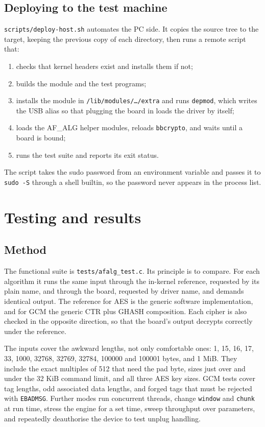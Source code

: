 \documentclass[11pt,a4paper,oneside]{report}
\newcommand{\code}[1]{\texttt{\small #1}}
\begin{document}
\section{Deploying to the test machine}

\code{scripts/deploy-host.sh} automates the PC side. It copies the source tree to the target, keeping the previous copy of each directory, then runs a remote script that:

\begin{enumerate}
  \item checks that kernel headers exist and installs them if not;
  \item builds the module and the test programs;
  \item installs the module in \code{/lib/modules/\ldots/extra} and runs \code{depmod}, which writes the USB alias so that plugging the board in loads the driver by itself;
  \item loads the AF\_ALG helper modules, reloads \code{bbcrypto}, and waits until a board is bound;
  \item runs the test suite and reports its exit status.
\end{enumerate}

The script takes the sudo password from an environment variable and passes it to \code{sudo -S} through a shell builtin, so the password never appears in the process list.

\chapter{Testing and results}\label{ch:test}

\section{Method}

The functional suite is \code{tests/afalg\_test.c}. Its principle is to compare. For each algorithm it runs the same input through the in-kernel reference, requested by its plain name, and through the board, requested by driver name, and demands identical output. The reference for AES is the generic software implementation, and for GCM the generic CTR plus GHASH composition. Each cipher is also checked in the opposite direction, so that the board's output decrypts correctly under the reference.

The inputs cover the awkward lengths, not only comfortable ones: 1, 15, 16, 17, 33, 1000, 32768, 32769, 32784, 100000 and 100001 bytes, and 1 MiB. They include the exact multiples of 512 that need the pad byte, sizes just over and under the 32 KiB command limit, and all three AES key sizes. GCM tests cover tag lengths, odd associated data lengths, and forged tags that must be rejected with \code{EBADMSG}. Further modes run concurrent threads, change \code{window} and \code{chunk} at run time, stress the engine for a set time, sweep throughput over parameters, and repeatedly deauthorise the device to test unplug handling.
\end{document}
